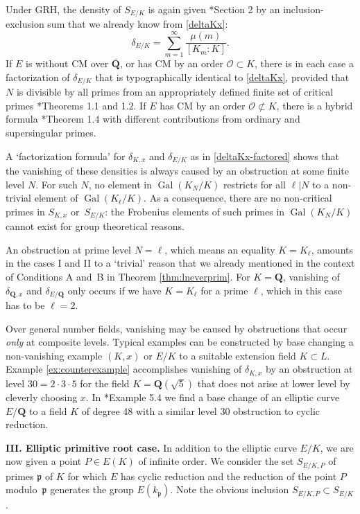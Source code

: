 \documentclass{amsart}
\theoremstyle{plain}
\theoremstyle{definition}
\DeclareMathOperator{\Gal}{Gal}
\newcommand{\OO}{\mathcal{O}}
\newcommand{\Que}{{\mathbf{Q}}}
\newcommand{\gothp}{{\mathfrak{p}}}
\begin{document}
Under GRH, the density of $S_{E/K}$ is again given 
\cite{Campagna-Stevenhagen}*{Section 2} by an
inclusion-exclusion sum that we already know from 
\eqref{deltaKx}:
\begin{equation}
\label{deltaEK}
\delta_{E/K}=\sum_{m=1}^{\infty} \frac{\mu(m)}{[K_m:K]}.
\end{equation}
If $E$ is without CM over $\overline\Que$,
or has CM by an order $\OO\subset K$, there is in each case a factorization of $\delta_{E/K}$ that is typographically identical to
\eqref{deltaKx}, provided that $N$ is divisible 
by all  primes from an appropriately defined finite set of critical primes
\cite{Campagna-Stevenhagen}*{Theorems 1.1 and 1.2}.
If $E$ has CM by an order $\OO\not\subset K$, there is a
hybrid formula 
\cite{Campagna-Stevenhagen}*{Theorem 1.4}
with different contributions from ordinary and supersingular primes.

A `factorization formula' for $\delta_{K, x}$ and 
$\delta_{E/K}$ as in \eqref{deltaKx-factored} shows that
the vanishing of these densities is always caused
by an obstruction at some finite level $N$. 
For such $N$, no element in $\Gal(K_N/K)$ restricts for all $\ell|N$ to a non-trivial 
element of $\Gal(K_\ell/K)$. 
As a consequence, there are no non-critical primes in $S_{K,x}$ or~$S_{E/K}$: 
the Frobenius elements of such primes in $\Gal(K_N/K)$ 
cannot exist for group theoretical reasons.

An obstruction at prime level $N=\ell$, which means 
an equality $K=K_\ell$, amounts in the cases I and II to a `trivial' reason
that we already mentioned in the context of Conditions A and~B in 
Theorem \ref{thm:lneverprim}.
For $K=\Que$, vanishing of $\delta_{\Que, x}$ and $\delta_{E/\Que}$ only occurs if we have $K=K_\ell$ for a prime $\ell$, which in this case has to be $\ell=2$.

Over general number fields, vanishing may be caused
by obstructions that occur \emph{only} at composite levels.  
Typical examples can be constructed by base changing a
non-vanishing example $(K, x)$ or $E/K$ to a suitable extension field $K\subset L$.
Example \ref{ex:counterexample} accomplishes vanishing of $\delta_{K,x}$ 
by an obstruction at level $30=2\cdot 3\cdot 5$ for the field $K=\Que(\sqrt 5)$ 
that does not arise at lower level by cleverly choosing $x$.
In \cite{Campagna-Stevenhagen}*{Example 5.4} we find 
a base change of an elliptic curve $E/\Que$ to a field $K$ of degree 48
with a similar level 30 obstruction to cyclic reduction.

\medskip\noindent
{\bf III. Elliptic primitive root case.}
In addition to the elliptic curve $E/K$, we are now given a
point $P\in E(K)$ of infinite order.
We consider the set $S_{E/K, P}$ of primes $\gothp$ of $K$ for which $E$ has cyclic reduction and 
the reduction of the point $P$ modulo~$\gothp$ generates the group $E(k_\gothp)$. 
Note the obvious inclusion $S_{E/K, P}\subset S_{E/K}$.
\end{document}
